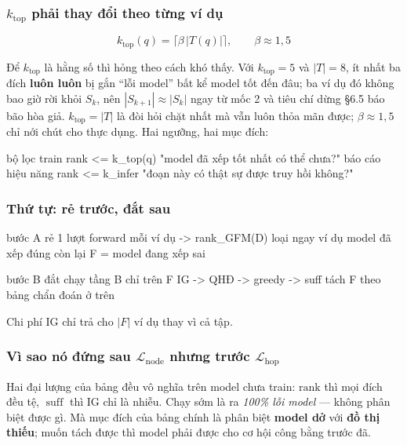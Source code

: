 \documentclass[11pt,a4paper]{article}
\DeclareMathOperator{\suff}{suff}
\begin{document}
\subsubsection*{$k_{\text{top}}$ phải thay đổi theo từng ví dụ}

\[ k_{\text{top}}(q)=\big\lceil \beta\,|T(q)| \big\rceil, \qquad \beta\approx 1{,}5 \]

Để $k_{\text{top}}$ là hằng số thì hỏng theo cách khó thấy. Với $k_{\text{top}}=5$ và
$|T|=8$, ít nhất ba đích \textbf{luôn luôn} bị gắn ``lỗi model'' bất kể model tốt đến đâu;
ba ví dụ đó không bao giờ rời khỏi $S_k$, nên $|S_{k+1}|\approx|S_k|$ ngay từ mốc 2 và tiêu
chí dừng \S6.5 báo bão hòa giả. $k_{\text{top}}=|T|$ là đòi hỏi chặt nhất mà vẫn luôn thỏa
mãn được; $\beta\approx 1{,}5$ chỉ nới chút cho thực dụng. Hai ngưỡng, hai mục đích:

\begin{dia}
bộ lọc train        rank <= k_top(q)    "model đã xếp tốt nhất có thể chưa?"
báo cáo hiệu năng   rank <= k_infer     "đoạn này có thật sự được truy hồi không?"
\end{dia}

\subsubsection*{Thứ tự: rẻ trước, đắt sau}

\begin{dia}
bước A   rẻ     1 lượt forward mỗi ví dụ  ->  rank_GFM(D)
                loại ngay ví dụ model đã xếp đúng
                còn lại  F = { model đang xếp sai }

bước B   đắt    chạy tầng B chỉ trên F
                IG -> QHĐ -> greedy -> suff
                tách F theo bảng chẩn đoán ở trên
\end{dia}

Chi phí IG chỉ trả cho $|F|$ ví dụ thay vì cả tập.

\subsubsection*{Vì sao nó đứng sau $\mathcal{L}_{\text{node}}$ nhưng trước $\mathcal{L}_{\text{hop}}$}

Hai đại lượng của bảng đều vô nghĩa trên model chưa train: $\mathrm{rank}$ thì mọi đích đều
tệ, $\suff$ thì IG chỉ là nhiễu. Chạy sớm là ra \emph{100\% lỗi model} --- không phân biệt
được gì. Mà mục đích của bảng chính là phân biệt \textbf{model dở} với \textbf{đồ thị
thiếu}; muốn tách được thì model phải được cho cơ hội công bằng trước đã.
\end{document}
